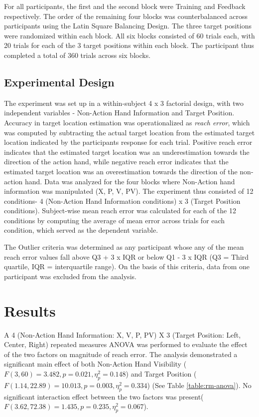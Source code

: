 For all participants, the first and the second block were Training and Feedback respectively. The order of the remaining four blocks was counterbalanced across participants using the Latin Square Balancing Design. The three target positions were randomized within each block. All six blocks consisted of 60 trials each, with 20 trials for each of the 3 target positions within each block. The participant thus completed a total of 360 trials across six blocks.

\subsection{Experimental Design}


The experiment was set up in a within-subject 4 x 3 factorial design, with two independent variables - Non-Action Hand Information and Target Position. Accuracy in target location estimation was operationalized as \textit{reach error}, which was computed by subtracting the actual target location from the estimated target location indicated by the participants response for each trial. Positive reach error indicates that the estimated target location was an underestimation towards the direction of the action hand, while negative reach error indicates that the estimated target location was an overestimation towards the direction of the non-action hand. Data was analyzed for the four blocks where Non-Action hand information was manipulated (X, P, V, PV). The experiment thus consisted of 12 conditions- 4 (Non-Action Hand Information conditions) x 3 (Target Position conditions). Subject-wise mean reach error was calculated for each of the 12 conditions by computing the average of mean error across trials for each condition, which served as the dependent variable.  

The Outlier criteria was determined as any participant whose any of the mean reach error values fall above Q3 + 3 x IQR or below Q1 - 3 x IQR (Q3 = Third quartile, IQR = interquartile range). On the basis of this criteria, data from one participant was excluded from the analysis.



\section{Results}




A 4 (Non-Action Hand Information: X, V, P, PV) X 3 (Target Position: Left, Center, Right) repeated measures ANOVA was performed to evaluate the effect of the two factors on magnitude of reach error. The analysis demonstrated a significant main effect of both Non-Action Hand Visibility ($F(3,60) = 3.482 , p = 0.021, \eta_{p}^{2} = 0.148$) and Target Position ($F(1.14,22.89) = 10.013, p = 0.003, \eta_{p}^{2} = 0.334$)  (See Table \ref{table:rm-anova}). No significant interaction effect between the two factors was present($F(3.62,72.38) = 1.435, p = 0.235, \eta_{p}^{2} = 0.067$). 

